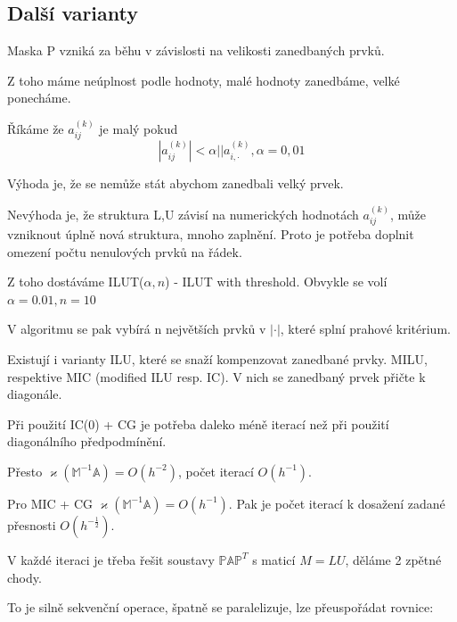 \documentclass[../main.tex]{subfiles}
\begin{document}
\subsection{Další varianty}

Maska P vzniká za běhu v závislosti na velikosti zanedbaných prvků.

Z toho máme neúplnost podle hodnoty, malé hodnoty zanedbáme, velké ponecháme.

Říkáme že $a_{ij}^{(k)}$ je malý pokud \begin{equation*}
    |a_{ij}^(k)| < \alpha ||a_{i,\cdot}^{(k)}, \alpha = 0,01
\end{equation*}

Výhoda je, že se nemůže stát abychom zanedbali velký prvek. 

Nevýhoda je, že struktura L,U závisí na numerických hodnotách $a_{ij}^{(k)}$, může vzniknout úplně nová struktura, mnoho zaplnění.
Proto je potřeba doplnit omezení počtu nenulových prvků na řádek.

Z toho dostáváme ILUT($\alpha, n$) - ILUT with threshold. Obvykle se volí $\alpha = 0.01, n=10$

V algoritmu se pak vybírá n největších prvků  v $|\cdot|$, které splní prahové kritérium.


\begin{remark}
    Existují i varianty ILU, které se snaží kompenzovat zanedbané prvky. MILU, respektive MIC (modified ILU resp. IC).
    V nich se zanedbaný prvek přičte k diagonále.
\end{remark}

\begin{remark}
    Při použití IC(0) + CG je potřeba daleko méně iterací než při použití diagonálního předpodmínění.

    Přesto $\varkappa(\mathbb{M}^{-1} \mathbb{A}) = O(h^{-2})$, počet iterací $O(h^{-1})$.

    Pro MIC + CG $\varkappa(\mathbb{M}^{-1} \mathbb{A}) = O(h^{-1})$. Pak je počet iterací k dosažení zadané přesnosti  $O(h^{-\frac{1}{2}})$.
\end{remark}

\begin{remark}
    V každé iteraci je třeba řešit soustavy $\mathbb{P} \mathbb{A} \mathbb{P}^T$ s maticí $M = LU$, děláme 2 zpětné chody.

    To je silně sekvenční operace, špatně se paralelizuje, lze přeuspořádat rovnice:



\end{remark}
\end{document}
